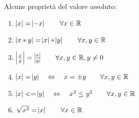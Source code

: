 \documentclass[12pt, letterpaper]{article}
\begin{document}
	Alcune proprietà del valore assoluto:
	
	\begin{enumerate}
		\item $\abs{x} = \abs{-x} \qquad \forall x \in \mathbb{R}$
		\item $\abs{x * y}=\abs{x} * \abs{y} \qquad \forall x, y \in \mathbb{R}$
		\item $\abs{\frac{x}{y}} = \frac{\abs{x}}{\abs{y}} \qquad \forall x, y \in\mathbb{R}, y \neq 0$
		\item $\abs{x} = \abs{y} \quad \Leftrightarrow \quad x = \pm{y} \qquad \forall x, y \in \mathbb{R}$
		\item $\abs{x} <= \abs{y} \quad \Leftrightarrow \quad x^2 \leq y^2 \qquad \forall x, y \in \mathbb{R}$
		\item $\sqrt{x^2} = \abs{x} \qquad \forall x \in \mathbb{R}$
	\end{enumerate}
		
	
\end{document}

